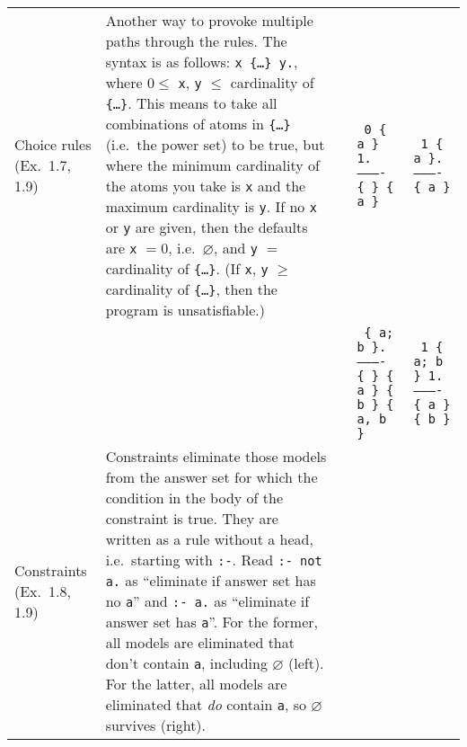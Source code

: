 \documentclass[10pt,a4paper,landscape]{article}
\begin{document}
\begin{longtable}{p{3cm}p{14cm}lp{3.5cm}p{3.5cm}}
	Choice rules \newline (Ex.\ 1.7, 1.9)
		& Another way to provoke multiple paths through the rules.
		The syntax is as follows: \newline \texttt{x \{\ldots \} y.}, where $0 \leq$ \texttt{x}, \texttt{y} $\leq$ cardinality of \texttt{\{\ldots \}}. 
		This means to take all combinations of atoms in \texttt{\{\ldots \}} (i.e.\ the power set) to be true, but where the minimum cardinality of the atoms you take is \texttt{x} and the maximum cardinality is \texttt{y}. 
		If no \texttt{x} or \texttt{y} are given, then the defaults are \texttt{x} $ = 0$, i.e.\ $\varnothing$, and \texttt{y} $=$ cardinality of \texttt{\{\ldots \}}.
		(If \texttt{x}, \texttt{y} $\geq$ cardinality of \texttt{\{\ldots \}}, then the program is unsatisfiable.)
		&& \texttt{%
			0 \{ a \} 1. \newline
			---------- \newline
			\{ \} \newline
			\{ a \} }
		& \texttt{%
			1 \{ a \}. \newline
			---------- \newline
			\{ a \} }\\
		
		&&& \texttt{%
			\{ a; b \}. \newline
			---------- \newline
			\{ \} \newline
			\{ a \} \newline
			\{ b \} \newline
			\{ a, b \} }
		& \texttt{%
			1 \{ a; b \} 1. \newline
			---------- \newline
			\{ a \} \newline
			\{ b \} }\\ \midrule
		
	Constraints \newline (Ex.\ 1.8, 1.9)
		& Constraints eliminate those models from the answer set for which the condition in the body of the constraint is true.
		They are written as a rule without a head, i.e.\ starting with \texttt{:-}.
		Read \texttt{:- not a.} as ``eliminate if answer set has no \texttt{a}'' and \texttt{:- a.} as ``eliminate if answer set has \texttt{a}''.
		For the former, all models are eliminated that don't contain \texttt{a}, including $\varnothing$ (left).
		For the latter, all models are eliminated that \textit{do} contain \texttt{a}, so $\varnothing$ survives (right).


\end{longtable}
\end{document}
